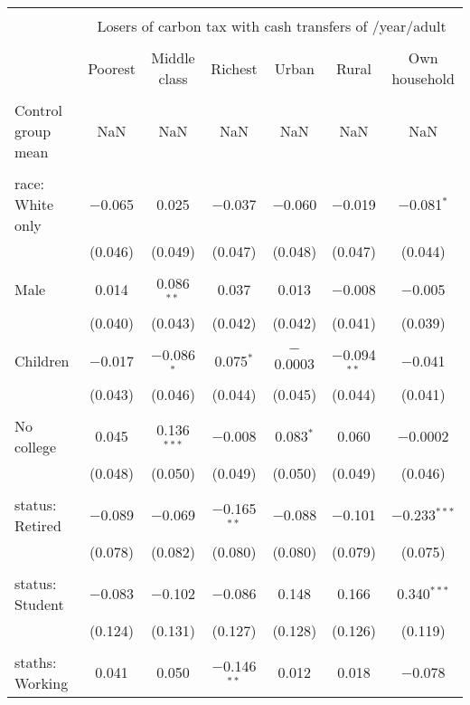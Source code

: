 
\begin{tabular}{@{\extracolsep{5pt}}lcccccc} 
\\[-1.8ex]\hline 
\hline \\[-1.8ex] 
 & \multicolumn{6}{c}{Losers of carbon tax with cash transfers of \textdollar 600/year/adult} \\ 
\cline{2-7} 
\\[-1.8ex] & Poorest & Middle class & Richest & Urban & Rural & Own household \\ 
\hline \\[-1.8ex] 
 Control group mean & NaN & NaN & NaN & NaN & NaN & NaN  \\ \hline \\[-1.8ex] race: White only & $-$0.065 & 0.025 & $-$0.037 & $-$0.060 & $-$0.019 & $-$0.081$^{*}$ \\ 
  & (0.046) & (0.049) & (0.047) & (0.048) & (0.047) & (0.044) \\ 
  & & & & & & \\ 
 Male & 0.014 & 0.086$^{**}$ & 0.037 & 0.013 & $-$0.008 & $-$0.005 \\ 
  & (0.040) & (0.043) & (0.042) & (0.042) & (0.041) & (0.039) \\ 
  & & & & & & \\ 
 Children & $-$0.017 & $-$0.086$^{*}$ & 0.075$^{*}$ & $-$0.0003 & $-$0.094$^{**}$ & $-$0.041 \\ 
  & (0.043) & (0.046) & (0.044) & (0.045) & (0.044) & (0.041) \\ 
  & & & & & & \\ 
 No college & 0.045 & 0.136$^{***}$ & $-$0.008 & 0.083$^{*}$ & 0.060 & $-$0.0002 \\ 
  & (0.048) & (0.050) & (0.049) & (0.050) & (0.049) & (0.046) \\ 
  & & & & & & \\ 
 status: Retired & $-$0.089 & $-$0.069 & $-$0.165$^{**}$ & $-$0.088 & $-$0.101 & $-$0.233$^{***}$ \\ 
  & (0.078) & (0.082) & (0.080) & (0.080) & (0.079) & (0.075) \\ 
  & & & & & & \\ 
 status: Student & $-$0.083 & $-$0.102 & $-$0.086 & 0.148 & 0.166 & 0.340$^{***}$ \\ 
  & (0.124) & (0.131) & (0.127) & (0.128) & (0.126) & (0.119) \\ 
  & & & & & & \\ 
 staths: Working & 0.041 & 0.050 & $-$0.146$^{**}$ & 0.012 & 0.018 & $-$0.078 \\ 

\end{tabular}
